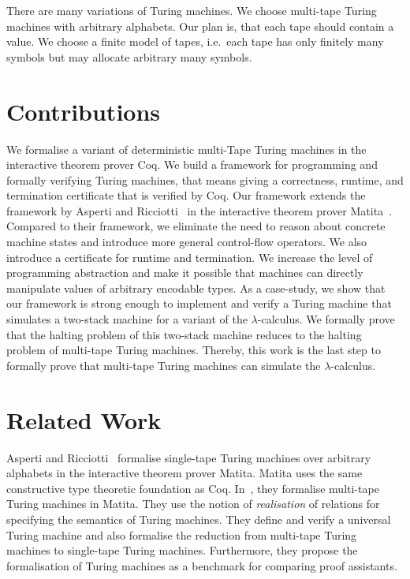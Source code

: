 There are many variations of Turing machines.  We choose multi-tape Turing machines with arbitrary alphabets.  Our plan is, that each tape should
contain a value.  We choose a finite model of tapes, i.e.\ each tape has only finitely many symbols but may allocate arbitrary many symbols.


\section{Contributions}
\label{sec:contributions}

We formalise a variant of deterministic multi-Tape Turing machines in the interactive theorem prover Coq.  We build a framework for programming and
formally verifying Turing machines, that means giving a correctness, runtime, and termination certificate that is verified by Coq.  Our framework
extends the framework by Asperti and Ricciotti~\cite{asperti2015} in the interactive theorem prover Matita~\cite{asperti2011matita}.  Compared to
their framework, we eliminate the need to reason about concrete machine states and introduce more general control-flow operators.  We also introduce a
certificate for runtime and termination.  We increase the level of programming abstraction and make it possible that machines can directly manipulate
values of arbitrary encodable types.  As a case-study, we show that our framework is strong enough to implement and verify a Turing machine that
simulates a two-stack machine for a variant of the $\lambda$-calculus.  We formally prove that the halting problem of this two-stack machine reduces
to the halting problem of multi-tape Turing machines.  Thereby, this work is the last step to formally prove that multi-tape Turing machines can
simulate the $\lambda$-calculus.

\section{Related Work}
\label{sec:relatedwork}

Asperti and Ricciotti~\cite{asperti2012} formalise single-tape Turing machines over arbitrary alphabets in the interactive theorem prover Matita.
Matita uses the same constructive type theoretic foundation as Coq.  In~\cite{asperti2015}, they formalise multi-tape Turing machines in Matita.  They
use the notion of \textit{realisation} of relations for specifying the semantics of Turing machines.  They define and verify a universal Turing
machine and also formalise the reduction from multi-tape Turing machines to single-tape Turing machines.  Furthermore, they propose the formalisation
of Turing machines as a benchmark for comparing proof assistants.

